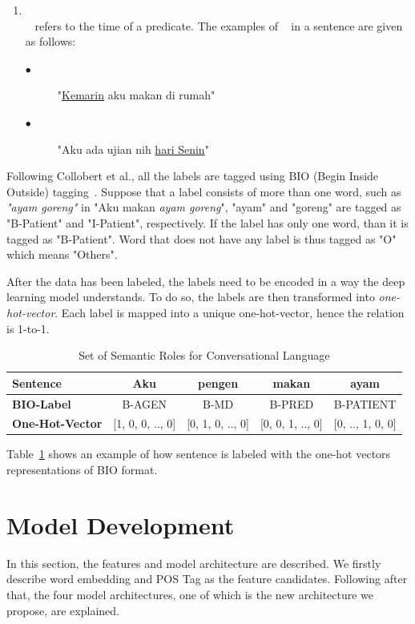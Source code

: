 \begin{enumerate}
	\item \timesrl\\
	\timesrl~ refers to the time of a predicate. The examples of \timesrl~ in a sentence are given as follows:
	\begin{description}
		\item[$\bullet$] "\underline{Kemarin} aku makan di rumah"
		\item[$\bullet$] "Aku ada ujian nih \underline{hari Senin}"
	\end{description}
\end{enumerate}

Following Collobert et al., all the labels are tagged using BIO (Begin Inside Outside) tagging~\cite{collobert2011natural}. Suppose that a label \patient consists of more than one word, such as \textit{"ayam goreng"} in "Aku makan \textit{ayam goreng}", "ayam" and "goreng" are tagged as "B-Patient" and "I-Patient", respectively. If the label has only one word, than it is tagged as "B-Patient". Word that does not have any label is thus tagged as "O" which means "Others".

After the data has been labeled, the labels need to be encoded in a way the deep learning model understands. To do so, the labels are then transformed into \textit{one-hot-vector}. Each label is mapped into a unique one-hot-vector, hence the relation is 1-to-1.
\begin{table}
	\centering
	\caption{Set of Semantic Roles for Conversational Language}
	\label{tab:examplelabel}
	\begin{tabular}{|lcccc|}
		\hline
		\textbf{Sentence} 				& Aku & pengen & makan & ayam \\
		\hline
		\textbf{BIO-Label}				& B-AGEN & B-MD & B-PRED & B-PATIENT  \\
		\hline
		\textbf{One-Hot-Vector}		& [1, 0, 0, .., 0] & [0, 1, 0, .., 0] & [0, 0, 1, .., 0] & [0, .., 1, 0, 0] \\
		\hline
	\end{tabular}
\end{table}

Table~\ref{tab:examplelabel} shows an example of how sentence is labeled with the one-hot vectors representations of BIO format.

\section{Model Development}
In this section, the features and model architecture are described. We firstly describe word embedding and POS Tag as the feature candidates. Following after that, the four model architectures, one of which is the new architecture we propose, are explained.

